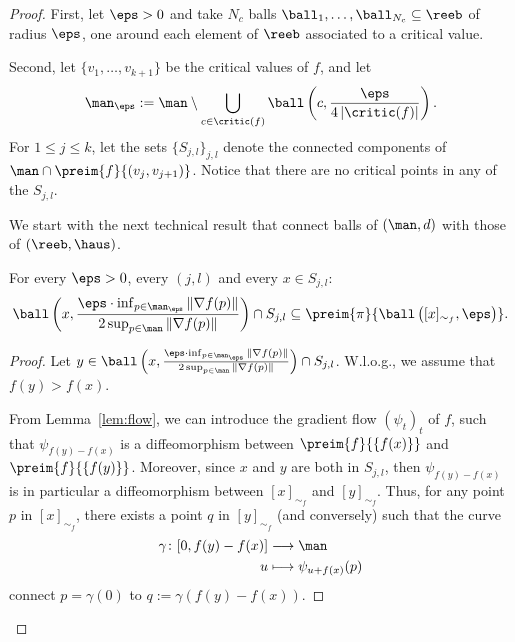   \begin{proof}
 First, let $\eps>0$ and  take $N_c$ balls $\ball_1,\dots,\ball_{N_c}\subseteq \reeb$ of radius $\eps$, one around each element of $\reeb$ associated to a critical value. %

 Second, let $\{v_1,\dots,v_{k+1}\}$ be the critical values of $f$, and let
 $$\man_\eps :=\man\setminus \bigcup_{c \in \critic(f)}\ball\left(c,\frac{\eps}{4\left|\critic(f)\right|}\right).$$
 For $1\leq j\leq k$, let the sets $\{S_{j,l}\}_{j,l}$ 
 denote the connected components of $\man\cap \preim{f}{(v_j,v_{j+1})}$. Notice that there are no critical points in any of the $S_{j,l}$.
 
 We start with the next technical result that connect balls of $(\man,d)$ with those of $(\reeb,\haus)$.
 
 \begin{assertion*}
 For every $\eps>0$, every $(j,l)$ and every $x\in S_{j,l}$:
 $$\ball\left(x,\frac{\eps\cdot \inf_{p\in\man_\eps}\Vert\nabla f(p)\Vert}{2\sup_{p\in\man}\Vert\nabla f(p)\Vert}\right)\cap S_{j,l}\subseteq \preim{\pi}{\ball\left([x]_{\sim_f},\eps\right)}.$$
 \end{assertion*}
 
 \begin{proof}
 Let $y\in \ball\left(x,\frac{\eps\cdot \inf_{p\in\man_\eps}\Vert\nabla f(p)\Vert}{2\sup_{p\in\man}\Vert\nabla f(p)\Vert}\right)\cap S_{j,l}$. W.l.o.g., we assume that $f(y)>f(x)$.
 
From Lemma~\ref{lem:flow}, we can introduce the gradient flow $(\psi_t)_t$ %
of $f$, such that  $\psi_{f(y)-f(x)}$  is a diffeomorphism between $\preim{f}{\{f(x)\}}$ and $\preim{f}{\{f(y)\}}$. Moreover, since $x$ and $y$ are both in $S_{j,l}$, then $\psi_{f(y)-f(x)}$ is in particular a diffeomorphism between $[x]_{\sim_f}$ and $[y]_{\sim_f}$. Thus, for any point $p$ in $[x]_{\sim_f}$, there exists a point $q$ in $[y]_{\sim_f}$ (and conversely) such that the curve
 \begin{align*}
 \gamma\colon[0,f(y)-f(x)]&\longrightarrow \man\\
 u&\longmapsto\psi_{u+f(x)}(p)
 \end{align*}
connect $p = \gamma(0)$ to $q := \gamma(f(y)-f(x))$.


\end{proof}
\end{proof}
